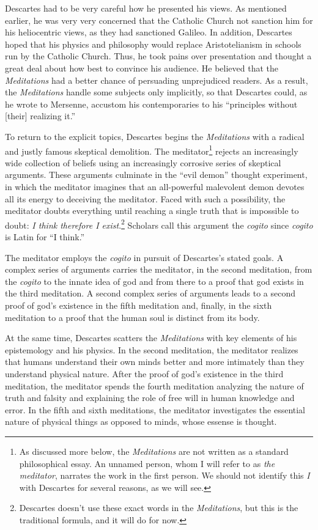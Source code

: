 Descartes had to be very careful how he presented his views. As mentioned earlier, he was very very concerned that the Catholic Church not sanction him for his heliocentric views, as they had sanctioned Galileo. In addition, Descartes hoped that his physics and philosophy would replace Aristotelianism in schools run by the Catholic Church. Thus, he took pains over presentation and thought a great deal about how best to convince his audience. He believed that the \textit{Meditations} had a better chance of persuading unprejudiced readers. As a result, the \textit{Meditations} handle some subjects only implicitly, so that Descartes could, as he wrote to Mersenne, accustom his contemporaries to his ``principles without [their] realizing it.''

To return to the explicit topics, Descartes begins the \textit{Meditations} with a radical and justly famous skeptical demolition. The meditator\footnote{As discussed more below, the \textit{Meditations} are not written as a standard philosophical essay. An unnamed person, whom I will refer to as \textit{the meditator}, narrates the work in the first person. We should not identify this \textit{I} with Descartes for several reasons, as we will see.} rejects an increasingly wide collection of beliefs using an increasingly corrosive series of skeptical arguments. These arguments culminate in the ``evil demon'' thought experiment, in which the meditator imagines that an all-powerful malevolent demon devotes all its energy to deceiving the meditator. Faced with such a possibility, the meditator doubts everything until reaching a single truth that is impossible to doubt: \textit{I think therefore I exist}.\footnote{Descartes doesn't use these exact words in the \textit{Meditations}, but this is the traditional formula, and it will do for now.} Scholars call this argument the \textit{cogito} since \textit{cogito} is Latin for ``I think.''

The meditator employs the \textit{cogito} in pursuit of Descartes's stated goals. A complex series of arguments carries the meditator, in the second meditation, from the \textit{cogito} to the innate idea of god and from there to a proof that god exists in the third meditation. A second complex series of arguments leads to a second proof of god's existence in the fifth meditation and, finally, in the sixth meditation to a proof that the human soul is distinct from its body.

At the same time, Descartes scatters the \textit{Meditations} with key elements of his epistemology and his physics. In the second meditation, the meditator realizes that humans understand their own minds better and more intimately than they understand physical nature. After the proof of god's existence in the third meditation, the meditator spends the fourth meditation analyzing the nature of truth and falsity and explaining the role of free will in human knowledge and error. In the fifth and sixth meditations, the meditator investigates the essential nature of physical things as opposed to minds, whose essense is thought.

